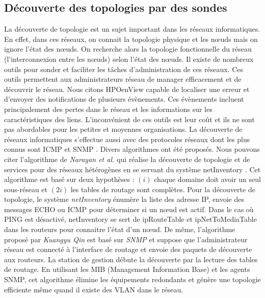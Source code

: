\subsection{D\'ecouverte des topologies par des sondes}
La d\'ecouverte de topologie est un sujet important dans les r\'eseaux informatiques.
En effet, dans ces r\'eseaux,  on connait la topologie physique et les n\oe uds mais on ignore l'\'etat des n\oe uds. On recherche alors la topologie fonctionnelle du r\'eseau (l'interconnexion entre les n\oe uds) selon l'\'etat des n\oe uds. 
Il existe de nombreux outils pour sonder et faciliter les t\^aches d'administration de ces r\'eseaux. 
Ces outils permettent aux administrateurs r\'eseau de manager efficacement et de d\'ecouvrir le r\'eseau.
Nous citons HPOenView \cite{OpenView} capable de localiser une erreur et d'envoyer des notifications de plusieurs \'ev\`enements. Ces \'ev\`enements incluent principalement des pertes dans le r\'eseau et les informations sur les caract\'eristiques des liens.
L'inconv\'enient de ces outils est leur co\^ut et ils ne sont pas abordables pour les petites et moyennes organisations.
La d\'ecouverte de r\'eseaux informatiques s'effectue  aussi avec des protocoles r\'eseaux dont les plus connus sont ICMP \cite{rfc792} et SNMP \cite{rfc2821}.
Divers algorithmes ont \'et\'e propos\'es. 
Nous pouvons citer l'algorithme de {\em Narayan et al.} \cite{Breitbart:2004:TDH:1008463.1008464} qui r\'ealise la d\'ecouverte de topologie et de services pour des r\'eseaux h\'et\'erog\`enes en se servant du syst\`eme netInventory \cite{netInventory}. 
Cet algorithme est bas\'e sur deux hypoth\`eses : 
$(i)$ chaque domaine doit avoir un seul sous-r\'eseau et 
$(2i)$ les tables de routage sont compl\`etes. 
Pour la d\'ecouverte de topologie, le syst\`eme {\em netInventory} \'enum\`ere la liste des adresse IP, envoie des messages ECHO ou ICMP pour d\'eterminer si un n\oe ud est actif. Dans le cas o\`u PING est d\'esactiv\'e, netInventory se sert de ipRouteTable et ipNetToMediaTable dans les routeurs pour connaitre l'\'etat d'un n\oe ud.
\newline
De m\^eme, l'algorithme propos\'e par {\em Kuangyu Qin} \cite{QinKuangyuChunquan2010} est bas\'e sur {\em SNMP} et suppose que l'administrateur r\'eseau est connect\'e \`a l'interface de routage et envoie des paquets de d\'ecouverte aux routeurs. La station de gestion d\'ebute la d\'ecouverte par la lecture des tables de routage. En utilisant les MIB (Management Information Base) et les agents SNMP, cet algorithme \'elimine les \'equipements redondants et g\'en\`ere une topologie efficiente m\^eme quand il existe des VLAN dans le r\'eseau.
